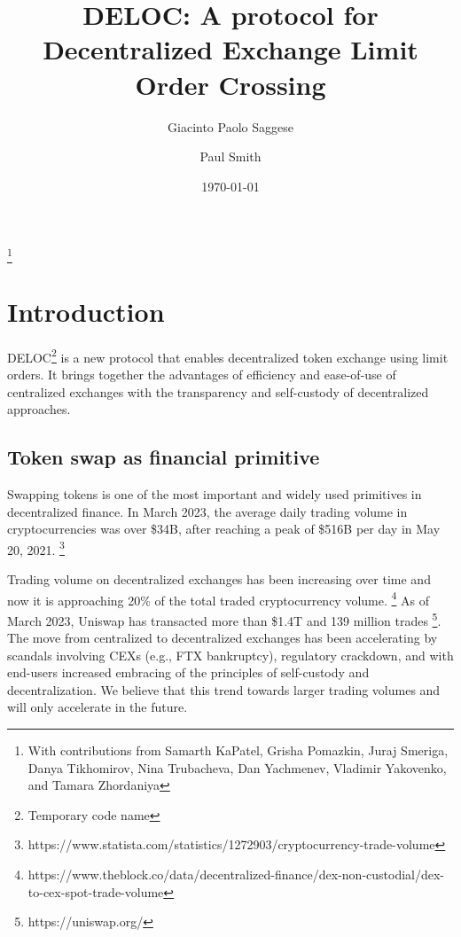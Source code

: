\documentclass[11pt, reqno]{amsart}
\theoremstyle{definition}
\theoremstyle{remark}
\begin{document}
\title{DELOC: A protocol for Decentralized Exchange Limit Order Crossing}

\author{Giacinto Paolo Saggese}
\author{Paul Smith}

\thanks{With contributions from
Samarth KaPatel,
Grisha Pomazkin,
Juraj Smeriga,
Danya Tikhomirov,
Nina Trubacheva,
Dan Yachmenev,
Vladimir Yakovenko,
and
Tamara Zhordaniya}

\date{\today}

\maketitle

\tableofcontents



\section{Introduction}

DELOC\footnote{Temporary code name}
is a new protocol that enables decentralized token exchange using limit
orders. It brings together the advantages of efficiency and ease-of-use of
centralized exchanges with the transparency and self-custody of
decentralized approaches.

\subsection{Token swap as financial primitive}
Swapping tokens is one of the most important and widely used primitives in
decentralized finance.
In March 2023, the average daily trading volume in cryptocurrencies was over
\$34B, after reaching a peak of \$516B per day in May 20, 2021.
\footnote{https://www.statista.com/statistics/1272903/cryptocurrency-trade-volume}


Trading volume on decentralized exchanges has been increasing over time and now
it is approaching 20\% of the total traded cryptocurrency volume.
\footnote{https://www.theblock.co/data/decentralized-finance/dex-non-custodial/dex-to-cex-spot-trade-volume}
As of March 2023, Uniswap has transacted more than \$1.4T and 139 million trades
\footnote{https://uniswap.org/}.
The move from centralized to decentralized exchanges has been accelerating by
scandals involving CEXs (e.g., FTX bankruptcy), regulatory crackdown, and with
end-users increased embracing of the principles of self-custody and
decentralization.
We believe that this trend towards larger trading volumes and 
will only accelerate in the future.
\end{document}
